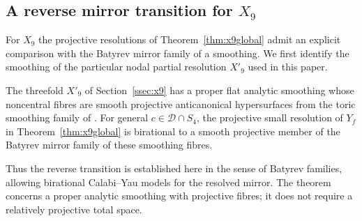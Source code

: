 \subsection{A reverse mirror transition for \texorpdfstring{$X_9$}{X9}}
\label{ssec:x9reverse}

For $X_9$ the projective resolutions of Theorem~\ref{thm:x9global}
admit an explicit comparison with the Batyrev mirror family of a
smoothing. We first identify the smoothing of the particular nodal
partial resolution $X'_9$ used in this paper.

\begin{theorem}\label{thm:x9reverse}
The threefold $X'_9$ of Section~\ref{ssec:x9} has a proper flat analytic
smoothing whose noncentral fibres are smooth projective
anticanonical hypersurfaces from the toric smoothing family of
\cite{Paper5}. For general $c\in\mathcal D\cap S_4$, the projective
small resolution of $Y_f$ in Theorem~\ref{thm:x9global} is birational to
a smooth projective member of the Batyrev mirror family of these
smoothing fibres.
\end{theorem}

Thus the reverse transition is established here in the sense of
Batyrev families, allowing birational Calabi--Yau models for the resolved
mirror. The theorem concerns a proper analytic smoothing with projective
fibres; it does not require a relatively projective total space.

